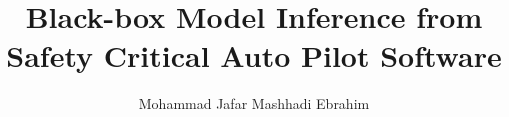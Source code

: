 \author{Mohammad Jafar Mashhadi Ebrahim}
\title{Black-box Model Inference from Safety Critical Auto Pilot Software}




\makethesistitle
